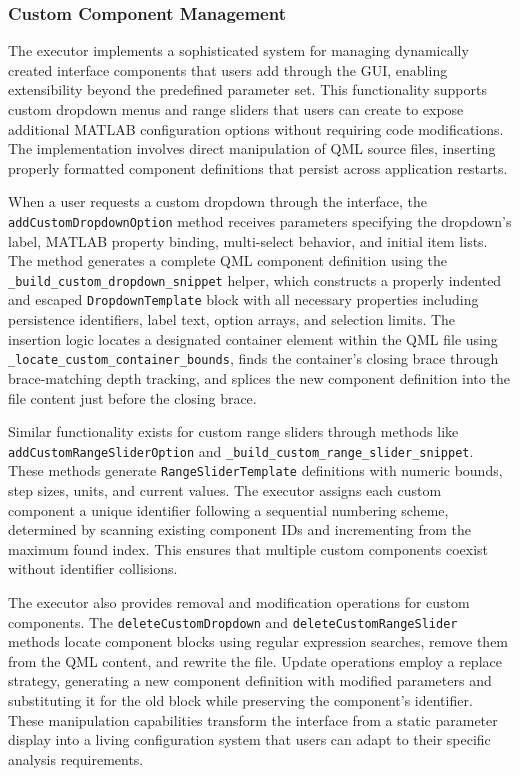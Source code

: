 \documentclass[12pt]{report}
\begin{document}
\subsubsection{Custom Component Management}

The executor implements a sophisticated system for managing dynamically created interface components that users add through the GUI, enabling extensibility beyond the predefined parameter set. This functionality supports custom dropdown menus and range sliders that users can create to expose additional MATLAB configuration options without requiring code modifications. The implementation involves direct manipulation of QML source files, inserting properly formatted component definitions that persist across application restarts.

When a user requests a custom dropdown through the interface, the \verb|addCustomDropdownOption| method receives parameters specifying the dropdown's label, MATLAB property binding, multi-select behavior, and initial item lists. The method generates a complete QML component definition using the \verb|_build_custom_dropdown_snippet| helper, which constructs a properly indented and escaped \verb|DropdownTemplate| block with all necessary properties including persistence identifiers, label text, option arrays, and selection limits. The insertion logic locates a designated container element within the QML file using \verb|_locate_custom_container_bounds|, finds the container's closing brace through brace-matching depth tracking, and splices the new component definition into the file content just before the closing brace.

Similar functionality exists for custom range sliders through methods like \verb|addCustomRangeSliderOption| and \verb|_build_custom_range_slider_snippet|. These methods generate \verb|RangeSliderTemplate| definitions with numeric bounds, step sizes, units, and current values. The executor assigns each custom component a unique identifier following a sequential numbering scheme, determined by scanning existing component IDs and incrementing from the maximum found index. This ensures that multiple custom components coexist without identifier collisions.

The executor also provides removal and modification operations for custom components. The \verb|deleteCustomDropdown| and \verb|deleteCustomRangeSlider| methods locate component blocks using regular expression searches, remove them from the QML content, and rewrite the file. Update operations employ a replace strategy, generating a new component definition with modified parameters and substituting it for the old block while preserving the component's identifier. These manipulation capabilities transform the interface from a static parameter display into a living configuration system that users can adapt to their specific analysis requirements.
\end{document}
